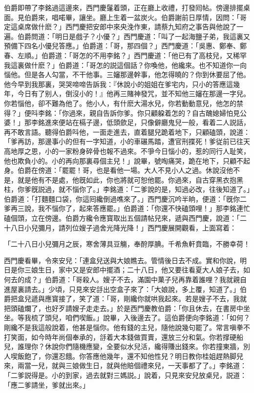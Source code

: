 伯爵即帶了李銘過這邊來，西門慶鬔着頭，正在廳上收禮，打發囘帖。傍邊排擺桌面。見伯爵來，唱喏畢，讓坐。廳上生着一盆炭火。伯爵謝前日厚情，因問：「哥定這桌席做什麽？」西門慶把安郎中來央浼作東，請蔡九知府之事告與他說了一遍。伯爵問道：「明日是戲子？小優？」西門慶道：「叫了一起海鹽子弟，我這裏又預備下四名小優兒答應。」伯爵道：「哥，那四個？」西門慶道：「吳惠、鄭奉、鄭春、左順。」伯爵道：「哥怎的不用李銘？」西門慶道：「他已有了高枝兒，又稀罕我這裏做什麽？」伯爵道：「哥怎的説這個話？你喚他，他纔來。也不知道你一向惱他。但是各人勾當，不干他事。三嬸那邊幹事，他怎得曉的？你到休要屈了他。他今早到我那裏，哭哭啼啼告訴我：『休說小的姐姐在爹宅内，只小的答應這幾年，今日有了别人，倒沒小的！』他再三賭神發咒，並不知他三嬸在那邊一字兒。你若惱他，卻不難為他了。他小人，有什麽大湯水兒，你若動動意兒，他怎的禁得？」便呌李銘：「你過來，親自告訴你爹。你只顧躱着怎的？自古醜媳婦怕見公婆！」那李銘進來便站在槅子邊，低頭歛足，只像僻廳鬼兒一般，看着二人説話，再不敢言語。聽得伯爵呌他，一面走進去，直着腿兒跪着地下，只顧磕頭，說道：「爹再訪，那邊事小的但有一字知道，小的車碾馬踏，遭官刑揲死！爹従前已往天高地厚之恩，小的一家粉身碎骨也報不過來。不爭今日惱小的，惹的同行人耻笑，他也欺負小的。小的再向那裏尋個主兒！」說畢，號啕痛哭，跪在地下，只顧不起身。伯爵在傍道：「罷罷！哥，也是看他一場。大人不見小人之過。休說沒他不是，就是他有不是處，他旣如此，你也將就可恕他罷。你過來，自古穿黑衣抱黑柱，你爹旣説過，就不惱你了。」李銘道：「二爹說的是，知過必改，往後知道了。」伯爵道：「打麵麵口袋，你這囘纔倒過噍來了。」西門慶沉吟半晌，便道：「旣你二爹再三說，我不惱你了，起來答應罷。」伯爵道：「你還不快磕頭哩！」那李銘連忙磕個頭，立在傍邊。伯爵方纔令應寳取出五個請帖兒來，遞與西門慶，說道：「二十八日小兒彌月，請列位嫂子過舍光降光降！」西門慶展開觀看，上面寫着：

\begin{myquote}[\markfont]
「二十八日小兒彌月之辰，寒舍薄具豆觴，奉酧厚腆。千希魚軒賁臨，不勝幸荷！

\end{myquote}

西門慶看畢，令來安兒：「連盒兒送與大娘瞧去。管情後日去不成。實和你說，明日是你三娘生日，家中又是安郎中擺酒；二十八日，他又要往看夏大人娘子去，如何去的成？」伯爵道：「哥殺人。嫂子不去，滿園中菓子兒再靠着誰哩？我就親自進屋裏請去。」少頃，只見來安㧱出空盒子來了：「大娘說，多上覆，知道了。」伯爵把盒兒遞與應寳接了，笑了道：「哥，剛纔你就哄我起來。若是嫂子不去，我就把頭磕爛了，也好歹請嫂子走走去。」於是西門慶教伯爵：「你且休去，在書房中坐坐。等我梳了頭兒，咱們喫飯。」說畢，入後邊去了。這伯爵便向李銘道：「如何？剛纔不是我這般說着，他甚是惱你。他有錢的主兒，隨他說幾句罷了。常言嗔拳不打笑面，如今時年尚個奉承的，㧱着大本錢做買賣，還放三分和氣。你若撑硬船兒，誰理你？休說你們隨機應變，全要似水兒活，纔得賺出錢來。你若撞東牆，別人喫飯飽了，你還忍餓。你答應他幾年，還不知他性兒？明日教你桂姐趕熱脚兒來，兩當一兒，就與三娘做生日，就與他賠個禮來兒，一天事都了了。」李銘道：「二爹説得是。小的到家，過去就對三媽説。」說着，只見來安兒放桌兒，説道：「應二爹請坐，爹就出來。」

